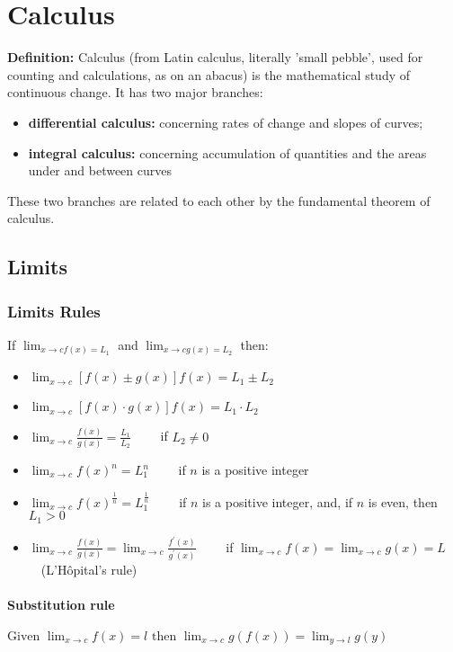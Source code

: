 \chapter{Calculus}
\textbf{Definition:} Calculus (from Latin calculus, literally 'small pebble', used for counting and calculations, as on an abacus) is the mathematical study of continuous change. It has two major branches:
\begin{itemize}  
	\item \textbf{differential calculus:} concerning rates of change and slopes of curves;
	\item \textbf{integral calculus:} concerning accumulation of quantities and the areas under and between curves
\end{itemize}
These two branches are related to each other by the fundamental theorem of calculus. 


\section{Limits}
\subsection{Limits Rules}
If $ \lim_{x \rightarrow c f(x) = L_1} $ and $ \lim_{x \rightarrow c g(x) = L_2} $ then:

\begin{itemize}
	\item $ \displaystyle \lim_{x \rightarrow c} \left[ f(x) \pm g(x) \right]f(x) = L_1 \pm L_2 $
	\item $ \displaystyle \lim_{x \rightarrow c} \left[ f(x) \cdot g(x) \right]f(x) = L_1 \cdot L_2 $
	\item $ \displaystyle \lim_{x \rightarrow c} \frac{f(x)}{g(x)} = \frac{L_1}{L_2} $ \ \ \ \  if $L_2 \ne 0$
	\item $ \displaystyle \lim_{x \rightarrow c} f(x)^n = L_1^n $ \ \ \ \  if $n$ is a positive integer
	\item $ \displaystyle \lim_{x \rightarrow c} f(x)^{\frac{1}{n}} = L_1^{\frac{1}{n}} $ \ \ \ \  if $n$ is a positive integer, and, if $n$ is even, then $L_1>0$
	\item $ \displaystyle \lim_{x \rightarrow c} \frac{f(x)}{g(x)} = \lim_{x \rightarrow c} \frac{f^\prime(x)}{g^\prime(x)}$ \ \ \ \ if $ \lim_{x \rightarrow c } f(x) = \lim_{x \rightarrow c } g(x) = L $ \ \ (L'Hôpital's rule)
\end{itemize}

\subsubsection{Substitution rule}
 $ \displaystyle 
\text{Given  } \lim_{x\rightarrow c}f(x)=l \text{   then   } \lim_{x\rightarrow c}g(f(x))=\lim_{y\rightarrow l}g(y) 
$

